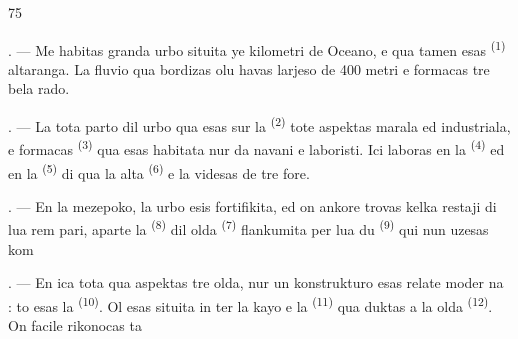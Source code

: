 %

\begin{VUpage}[77]{75}
\VUsaut{2.0mm}
\VUsaut{3.0mm}
\VUfilet{16mm}
\VUsaut{5.6mm}
\VUsaut{1.4mm}
\VUsaut{2.2mm}

\VUsaut{3.0mm}

. --- Me habitas granda urbo situita ye kilometri de Oceano, e qua tamen esas\nl
{} \textsuperscript{(1)} altaranga. La fluvio qua bordizas olu\nl
havas larjeso de 400 metri e formacas tre bela\nl
rado.

. --- La tota parto dil urbo qua esas sur la\nl
{} \textsuperscript{(2)} tote aspektas marala ed industriala, e\nl
formacas  \textsuperscript{(3)} qua esas habitata nur da\nl
navani e laboristi. Ici laboras en la \cc
{} \textsuperscript{(4)} ed en la  \textsuperscript{(5)} di qua la alta \cc
{} \textsuperscript{(6)} e la  videsas de tre fore.

. --- En la mezepoko, la urbo esis fortifikita,\nl
ed on ankore trovas kelka restaji di lua rem\cc
pari, aparte la  \textsuperscript{(8)} dil olda \cc
{} \textsuperscript{(7)} flankumita per lua du  \textsuperscript{(9)} qui nun\nl
uzesas kom 

. --- En ica tota  qua aspektas tre\nl
olda, nur un konstrukturo esas relate moder\cc
na : to esas la  \textsuperscript{(10)}. Ol esas situita in\cc
ter la kayo e la  \textsuperscript{(11)} qua duktas a la\nl
olda  \textsuperscript{(12)}. On facile rikonocas ta
\parplein
\end{VUpage}

